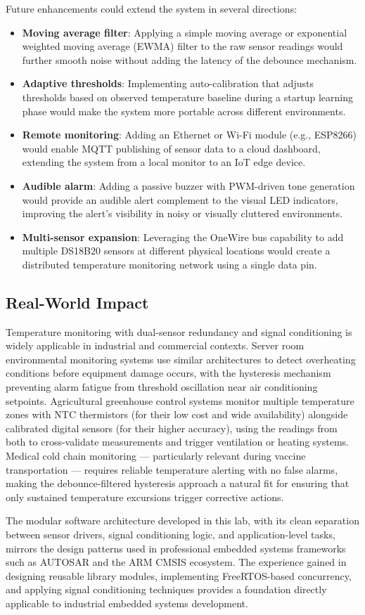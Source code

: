 Future enhancements could extend the system in several directions:
\begin{itemize}
    \item \textbf{Moving average filter}: Applying a simple moving average or exponential weighted moving average (EWMA) filter to the raw sensor readings would further smooth noise without adding the latency of the debounce mechanism.
    \item \textbf{Adaptive thresholds}: Implementing auto-calibration that adjusts thresholds based on observed temperature baseline during a startup learning phase would make the system more portable across different environments.
    \item \textbf{Remote monitoring}: Adding an Ethernet or Wi-Fi module (e.g., ESP8266) would enable MQTT publishing of sensor data to a cloud dashboard, extending the system from a local monitor to an IoT edge device.
    \item \textbf{Audible alarm}: Adding a passive buzzer with PWM-driven tone generation would provide an audible alert complement to the visual LED indicators, improving the alert's visibility in noisy or visually cluttered environments.
    \item \textbf{Multi-sensor expansion}: Leveraging the OneWire bus capability to add multiple DS18B20 sensors at different physical locations would create a distributed temperature monitoring network using a single data pin.
\end{itemize}

\subsection{Real-World Impact}

Temperature monitoring with dual-sensor redundancy and signal conditioning is widely applicable in industrial and commercial contexts. Server room environmental monitoring systems use similar architectures to detect overheating conditions before equipment damage occurs, with the hysteresis mechanism preventing alarm fatigue from threshold oscillation near air conditioning setpoints. Agricultural greenhouse control systems monitor multiple temperature zones with NTC thermistors (for their low cost and wide availability) alongside calibrated digital sensors (for their higher accuracy), using the readings from both to cross-validate measurements and trigger ventilation or heating systems. Medical cold chain monitoring --- particularly relevant during vaccine transportation --- requires reliable temperature alerting with no false alarms, making the debounce-filtered hysteresis approach a natural fit for ensuring that only sustained temperature excursions trigger corrective actions.

The modular software architecture developed in this lab, with its clean separation between sensor drivers, signal conditioning logic, and application-level tasks, mirrors the design patterns used in professional embedded systems frameworks such as AUTOSAR and the ARM CMSIS ecosystem. The experience gained in designing reusable library modules, implementing FreeRTOS-based concurrency, and applying signal conditioning techniques provides a foundation directly applicable to industrial embedded systems development.

